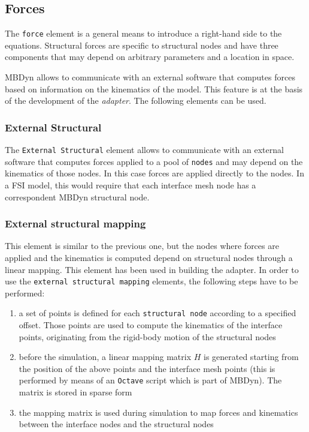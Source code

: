 \subsection{Forces}
\label{sec:mbd-forces}

The \texttt{force} element is a general means to introduce a right-hand side to the equations. Structural forces are specific to structural
nodes and  have three components that may depend on arbitrary parameters and a location in space.

MBDyn allows to communicate with an external software that computes forces based on information on the kinematics of the model. This feature is at the basis of the development of the \textit{adapter}. The following elements can be used.


\subsubsection{External Structural}

The \texttt{External Structural} element allows to communicate with an external software that computes forces applied to a pool of \texttt{nodes} and may depend on the kinematics of those nodes. In this case forces are applied directly to the nodes. In a FSI model, this would require that each interface mesh node has a correspondent MBDyn structural node. 

\subsubsection{External structural mapping}


This element is similar to the previous one, but the nodes where forces are applied and the kinematics is computed depend on structural nodes through a linear mapping. This element has been used in building the adapter. In order to use the \texttt{external structural mapping} elements, the following steps have to be performed:

\begin{enumerate}
	\item a set of points is defined for each \texttt{structural node} according to a specified offset. Those points are used to compute the kinematics of the interface points, originating from the rigid-body motion of the structural nodes
	\item before the simulation, a linear mapping matrix $H$ is generated starting from the position of the above points and the interface mesh points (this is performed by means of an \texttt{Octave} script which is part of MBDyn). The matrix is stored in sparse form
	\item the mapping matrix is used during simulation to map forces and kinematics between the interface nodes and the structural nodes
\end{enumerate}


